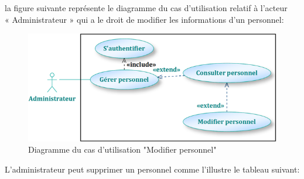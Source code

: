 \documentclass[12 pt ]{report}
\begin{document}
la figure suivante représente le diagramme du cas d’utilisation  relatif à l’acteur \\« Administrateur » qui a le droit de modifier les informations d'un personnel:
\begin{figure}[h]
 \begin{center}
\includegraphics[width=12 cm ,height= 3.5 cm]{a7.PNG}
\caption{Diagramme du cas d’utilisation "Modifier personnel"}
\end{center}
\end{figure}
\newpage
L’administrateur peut supprimer un personnel comme l’illustre le tableau suivant:
\end{document}
